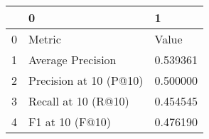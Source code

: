 \begin{tabular}{lll}
\toprule
 & 0 & 1 \\
\midrule
0 & Metric & Value \\
1 & Average Precision & 0.539361 \\
2 & Precision at 10 (P@10) & 0.500000 \\
3 & Recall at 10 (R@10) & 0.454545 \\
4 & F1 at 10 (F@10) & 0.476190 \\
\bottomrule
\end{tabular}
